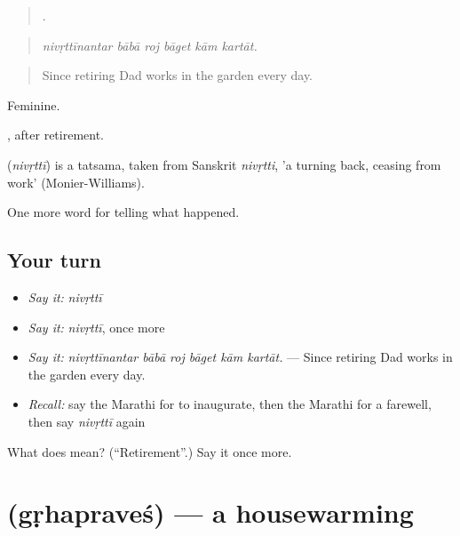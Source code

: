 \begin{quote}
     .
\end{quote}

\begin{quote}
\emph{nivṛttīnantar bābā roj bāget kām kartāt.}
\end{quote}

\begin{quote}
Since retiring Dad works in the garden every day.
\end{quote}

Feminine.

, after retirement.

\begin{cousinweb}
\textbf{} (\emph{nivṛttī}) is a tatsama, taken from Sanskrit \emph{nivṛtti}, 'a turning back, ceasing from work' (Monier-Williams).
\end{cousinweb}

\begin{grammarlens}[title={What you've built}]
One more word for telling what happened.
\end{grammarlens}

\subsection*{Your turn}
\begin{itemize}
\raggedright
  \item \emph{Say it:} \emph{nivṛttī}
  \item \emph{Say it:} \emph{nivṛttī}, once more
  \item \emph{Say it:} \emph{nivṛttīnantar bābā roj bāget kām kartāt.} — Since retiring Dad works in the garden every day.
  \item \emph{Recall:} say the Marathi for to inaugurate, then the Marathi for a farewell, then say \emph{nivṛttī} again
\end{itemize}

\begin{tcolorbox}[breakable,colback=teal!4,colframe=teal!35!black,title={Before you move on}]
What does  mean? (\textquotedblleft{}Retirement\textquotedblright{}.) Say it once more.
\end{tcolorbox}
\section[\texorpdfstring{\mr{गृहप्रवेश} (gṛhapraveś)}{गृहप्रवेश (gṛhapraveś)}]{ (gṛhapraveś) — a housewarming}


